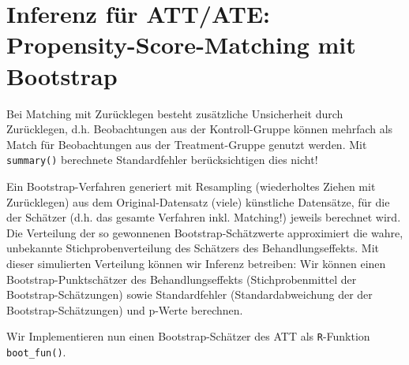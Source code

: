 \documentclass[
  a4paper,
  DIV=11,
  oneside]{scrreprt}
\newenvironment{Shaded}{\begin{snugshade}}{\end{snugshade}}
\newcommand{\NormalTok}[1]{\textcolor[rgb]{0.00,0.23,0.31}{#1}}
\begin{document}
\hypertarget{inferenz-fuxfcr-attate-propensity-score-matching-mit-bootstrap}{%
\section{Inferenz für ATT/ATE: Propensity-Score-Matching mit
Bootstrap}\label{inferenz-fuxfcr-attate-propensity-score-matching-mit-bootstrap}}

Bei Matching mit Zurücklegen besteht zusätzliche Unsicherheit durch
Zurücklegen, d.h. Beobachtungen aus der Kontroll-Gruppe können mehrfach
als Match für Beobachtungen aus der Treatment-Gruppe genutzt werden. Mit
\texttt{summary()} berechnete Standardfehler berücksichtigen dies nicht!

Ein Bootstrap-Verfahren generiert mit Resampling (wiederholtes Ziehen
mit Zurücklegen) aus dem Original-Datensatz (viele) künstliche
Datensätze, für die der Schätzer (d.h. das gesamte Verfahren inkl.
Matching!) jeweils berechnet wird. Die Verteilung der so gewonnenen
Bootstrap-Schätzwerte approximiert die wahre, unbekannte
Stichprobenverteilung des Schätzers des Behandlungseffekts. Mit dieser
simulierten Verteilung können wir Inferenz betreiben: Wir können einen
Bootstrap-Punktschätzer des Behandlungseffekts (Stichprobenmittel der
Bootstrap-Schätzungen) sowie Standardfehler (Standardabweichung der der
Bootstrap-Schätzungen) und p-Werte berechnen.

Wir Implementieren nun einen Bootstrap-Schätzer des ATT als
\texttt{R}-Funktion \texttt{boot\_fun()}.

\begin{Shaded}
\end{Shaded}
\end{document}
